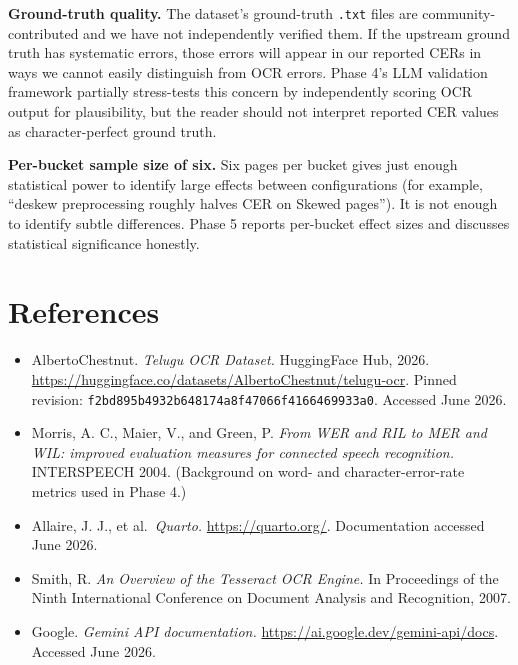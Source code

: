 \documentclass[
  letterpaper,
  DIV=11,
  numbers=noendperiod]{scrartcl}
\providecommand{\tightlist}{%
  \setlength{\itemsep}{0pt}\setlength{\parskip}{0pt}}
\begin{document}
\textbf{Ground-truth quality.} The dataset's ground-truth \texttt{.txt}
files are community-contributed and we have not independently verified
them. If the upstream ground truth has systematic errors, those errors
will appear in our reported CERs in ways we cannot easily distinguish
from OCR errors. Phase 4's LLM validation framework partially
stress-tests this concern by independently scoring OCR output for
plausibility, but the reader should not interpret reported CER values as
character-perfect ground truth.

\textbf{Per-bucket sample size of six.} Six pages per bucket gives just
enough statistical power to identify large effects between
configurations (for example, ``deskew preprocessing roughly halves CER
on Skewed pages''). It is not enough to identify subtle differences.
Phase 5 reports per-bucket effect sizes and discusses statistical
significance honestly.

\section{References}\label{references}

\begin{itemize}
\tightlist
\item
  AlbertoChestnut. \emph{Telugu OCR Dataset.} HuggingFace Hub, 2026.
  \url{https://huggingface.co/datasets/AlbertoChestnut/telugu-ocr}.
  Pinned revision: \texttt{f2bd895b4932b648174a8f47066f4166469933a0}.
  Accessed June 2026.
\item
  Morris, A. C., Maier, V., and Green, P. \emph{From WER and RIL to MER
  and WIL: improved evaluation measures for connected speech
  recognition.} INTERSPEECH 2004. (Background on word- and
  character-error-rate metrics used in Phase 4.)
\item
  Allaire, J. J., et al.~\emph{Quarto.} \url{https://quarto.org/}.
  Documentation accessed June 2026.
\item
  Smith, R. \emph{An Overview of the Tesseract OCR Engine.} In
  Proceedings of the Ninth International Conference on Document Analysis
  and Recognition, 2007.
\item
  Google. \emph{Gemini API documentation.}
  \url{https://ai.google.dev/gemini-api/docs}. Accessed June 2026.
\end{itemize}

\begin{tcolorbox}[enhanced jigsaw, arc=.35mm, bottomrule=.15mm, breakable, colback=white, colframe=quarto-callout-note-color-frame, left=2mm, leftrule=.75mm, opacityback=0, rightrule=.15mm, toprule=.15mm]
\begin{minipage}[t]{5.5mm}
\textcolor{quarto-callout-note-color}{\faInfo}
\end{minipage}%
\begin{minipage}[t]{\textwidth - 5.5mm}

\end{minipage}%
\end{tcolorbox}
\end{document}
